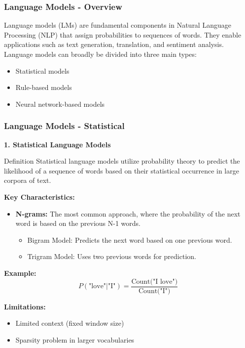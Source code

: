 \documentclass[aspectratio=169]{beamer}
\begin{document}
\begin{frame}[fragile]
    \frametitle{Language Models - Overview}
    Language models (LMs) are fundamental components in Natural Language Processing (NLP) that assign probabilities to sequences of words. They enable applications such as text generation, translation, and sentiment analysis. Language models can broadly be divided into three main types:
    
    \begin{itemize}
        \item Statistical models
        \item Rule-based models
        \item Neural network-based models
    \end{itemize}
\end{frame}

\begin{frame}[fragile]
    \frametitle{Language Models - Statistical}
    \textbf{1. Statistical Language Models}
    
    \begin{block}{Definition}
        Statistical language models utilize probability theory to predict the likelihood of a sequence of words based on their statistical occurrence in large corpora of text.
    \end{block}
    
    \textbf{Key Characteristics:}
    \begin{itemize}
        \item \textbf{N-grams:} The most common approach, where the probability of the next word is based on the previous N-1 words.
        \begin{itemize}
            \item Bigram Model: Predicts the next word based on one previous word.
            \item Trigram Model: Uses two previous words for prediction.
        \end{itemize}
    \end{itemize}
    
    \textbf{Example:}
    \begin{equation}
        P(\text{"love"} | \text{"I"}) = \frac{\text{Count("I love")}}{\text{Count("I")}}
    \end{equation}

    \textbf{Limitations:}
    \begin{itemize}
        \item Limited context (fixed window size)
        \item Sparsity problem in larger vocabularies
    \end{itemize}
\end{frame}
\end{document}
